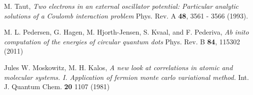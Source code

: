 \documentclass[english, a4paper]{article}
\begin{document}
\newpage

\begin{thebibliography}{9}


 M. Taut, 
 \textit{Two electrons in an external oscillator potential: Particular analytic solutions
 of a Coulomb interaction problem}
 Phys. Rev. A {\bf 48}, 3561 - 3566 (1993).
 
 M. L. Pedersen, G. Hagen, M. Hjorth-Jensen, S. Kvaal, and F. Pederiva, 
 \textit{Ab inito computation of the energies of circular quantum dots}
 Phys. Rev. B {\bf 84}, 115302 (2011)
 
 Jules W. Moskowitz, M. H. Kalos,
 \textit{A new look at correlations in atomic and molecular systems. 
         I. Application of fermion monte carlo variational method.}
 Int. J. Quantum Chem. {\bf 20} 1107 (1981)

\end{thebibliography}
\end{document}
